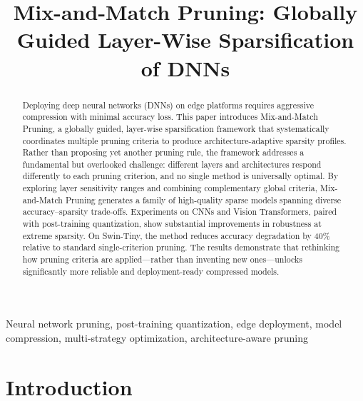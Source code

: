 \documentclass[11pt, conference]{IEEEtran}
\title{Mix-and-Match Pruning: Globally Guided Layer-Wise Sparsification of DNNs}
\begin{document}
\maketitle

\begin{abstract}
Deploying deep neural networks (DNNs) on edge platforms requires aggressive compression with minimal accuracy loss. This paper introduces Mix-and-Match Pruning, a globally guided, layer-wise sparsification framework that systematically coordinates multiple pruning criteria to produce architecture-adaptive sparsity profiles. Rather than proposing yet another pruning rule, the framework addresses a fundamental but overlooked challenge: different layers and architectures respond differently to each pruning criterion, and no single method is universally optimal. By exploring layer sensitivity ranges and combining complementary global criteria, Mix-and-Match Pruning generates a family of high-quality sparse models spanning diverse accuracy–sparsity trade-offs. Experiments on CNNs and Vision Transformers, paired with post-training quantization, show substantial improvements in robustness at extreme sparsity. On Swin-Tiny, the method reduces accuracy degradation by 40\% relative to standard single-criterion pruning. The results demonstrate that rethinking how pruning criteria are applied—rather than inventing new ones—unlocks significantly more reliable and deployment-ready compressed models.
\end{abstract}

\begin{IEEEkeywords}
Neural network pruning, post-training quantization, edge deployment, model compression, multi-strategy optimization, architecture-aware pruning
\end{IEEEkeywords}

\section{Introduction}

\end{document}
